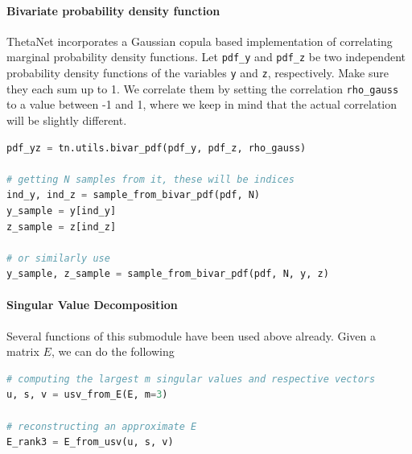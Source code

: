 \documentclass[bibliography=totoc, twoside]{article}
\numberwithin{equation}{section}
\begin{document}
\paragraph*{Bivariate probability density function}
ThetaNet incorporates a Gaussian copula based implementation of correlating marginal probability density functions.
Let \texttt{pdf\_y} and \texttt{pdf\_z} be two independent probability density functions of the variables \texttt{y} and \texttt{z}, respectively.
Make sure they each sum up to 1.
We correlate them by setting the correlation \texttt{rho\_gauss} to a value between -1 and 1, where we keep in mind that the actual correlation will be slightly different.
\begin{lstlisting}[language=python]
pdf_yz = tn.utils.bivar_pdf(pdf_y, pdf_z, rho_gauss)

# getting N samples from it, these will be indices
ind_y, ind_z = sample_from_bivar_pdf(pdf, N)
y_sample = y[ind_y]
z_sample = z[ind_z]

# or similarly use
y_sample, z_sample = sample_from_bivar_pdf(pdf, N, y, z)
\end{lstlisting}


\paragraph*{Singular Value Decomposition}
Several functions of this submodule have been used above already.
Given a matrix $E$, we can do the following
\begin{lstlisting}[language=python]
# computing the largest m singular values and respective vectors
u, s, v = usv_from_E(E, m=3)

# reconstructing an approximate E
E_rank3 = E_from_usv(u, s, v)
\end{lstlisting}
\end{document}
